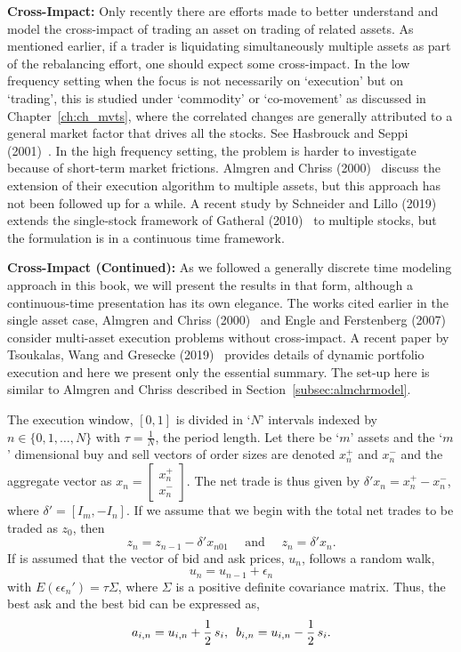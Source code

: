 \noindent\textbf{Cross-Impact:} Only recently there are efforts made to better understand and model the cross-impact of trading an asset on trading of related assets. As mentioned earlier, if a trader is liquidating simultaneously multiple assets as part of the rebalancing effort, one should expect some cross-impact. In the low frequency setting when the focus is not necessarily on `execution' but on `trading', this is studied under `commodity' or `co-movement' as discussed in Chapter~\ref{ch:ch_mvts}, where the correlated changes are generally attributed to a general market factor that drives all the stocks. See Hasbrouck and Seppi (2001)~\cite{seppi2001}. In the high frequency setting, the problem is harder to investigate because of short-term market frictions. Almgren and Chriss (2000)~\cite{alm2000} discuss the extension of their execution algorithm to multiple assets, but this approach has not been followed up for a while. A recent study by Schneider and Lillo (2019)~\cite{schnlillo19} extends the single-stock framework of Gatheral (2010)~\cite{gatheral} to multiple stocks, but the formulation is in a continuous time framework. \twomedskip


\noindent\textbf{Cross-Impact (Continued):} As we followed a generally discrete time modeling approach in this book, we will present the results in that form, although a continuous-time presentation has its own elegance. The works cited earlier in the single asset case, Almgren and Chriss (2000)~\cite{alm2000} and Engle and Ferstenberg (2007)~\cite{engle2007} consider multi-asset execution problems without cross-impact. A recent paper by Tsoukalas, Wang and Gresecke (2019)~\cite{} provides details of dynamic portfolio execution and here we present only the essential summary. The set-up here is similar to Almgren and Chriss described in Section~\ref{subsec:almchrmodel}.


The execution window, $[0,1]$ is divided in `$N$' intervals indexed by $n \in \{0,1,\ldots,N\}$ with $\tau=\frac{1}{N}$, the period length. Let there be `$m$' assets and the `$m$' dimensional buy and sell vectors of order sizes are denoted $x_n^+$ and $x_n^-$ and the aggregate vector as $x_n= \begin{bmatrix} x_n^+ \\ x_n^- \end{bmatrix}$. The net trade is thus given by $\delta' x_n = x_n^+ - x_n^-$, where $\delta'= [I_m, -I_n]$. If we assume that we begin with the total net trades to be traded as $z_0$, then
	\begin{equation}
	z_n = z_{n-1} - \delta' x_{n01} \quad\text{ and }\quad z_n= \delta' x_n.
	\end{equation}
If is assumed that the vector of bid and ask prices, $u_n$, follows a random walk,
	\begin{equation}
	u_n= u_{n-1} + \epsilon_n
	\end{equation}
with $E(\epsilon \epsilon_n')= \tau \Sigma$, where $\Sigma$ is a positive definite covariance matrix. Thus, the best ask and the best bid can be expressed as,
	\begin{equation}
	a_{i,n} = u_{i,n} + \frac{1}{2} \, s_i, \enskip b_{i,n} = u_{i,n} - \frac{1}{2}\, s_i.
	\end{equation}


